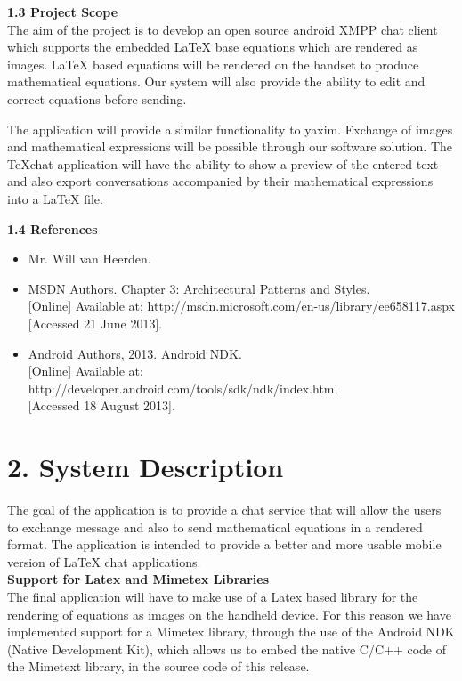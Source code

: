 \documentclass[29pt,a4paper]{moderncv}
\begin{document}
		\noindent \textbf{1.3 Project Scope}
			\\The aim of the project is to develop an open source android XMPP chat client which supports the embedded LaTeX base equations which are rendered as images. LaTeX based equations will be rendered on the handset to produce mathematical equations. Our system will also provide the ability to edit and correct equations before sending.
			
			\parindent 5mm The application will provide a similar functionality to yaxim. Exchange of images and mathematical expressions will be possible through our software solution. The TeXchat application will have the ability to show a preview of the entered text and also export conversations accompanied by their mathematical expressions into a LaTeX file.
			
		\vspace{5mm}
		
	\noindent \textbf{1.4 References}
		\begin{itemize}
		\item Mr. Will van Heerden.
			\item MSDN Authors. Chapter 3: Architectural Patterns and Styles. 
			\\{[Online]} Available at: http://msdn.microsoft.com/en-us/library/ee658117.aspx
			\\{[Accessed 21 June 2013].}
			
			\item Android Authors, 2013. Android NDK.\\ {[Online]} Available at: http://developer.android.com/tools/sdk/ndk/index.html
				\\{[Accessed 18 August 2013].}
		\end{itemize}
		\vspace{5mm}
		
\newpage
	\section*{\textbf{2. System Description}}
	\vspace{4mm}
		\noindent The goal of the application is to provide a chat service that will allow the users to exchange message and also to send mathematical equations in a rendered format. The application is intended to provide a better and more usable mobile version of LaTeX chat applications.\\ 
		
		\noindent\textbf{Support for Latex and Mimetex Libraries}
		\\The final application will have to make use of a Latex based library for the rendering of equations as images on the handheld device. For this reason we have implemented support for a Mimetex library, through the use of the Android NDK (Native Development Kit), which allows us to embed the native C/C++ code of the Mimetext library, in the source code of this release.\\
		
\end{document}
